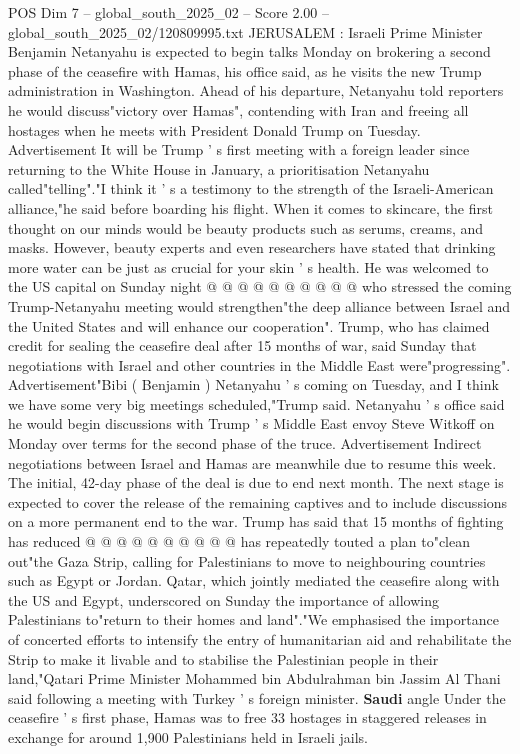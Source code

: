 \begin{textsample}{POS Dim 7 – global\_south\_2025\_02 – Score 2.00 – global\_south\_2025\_02/120809995.txt}  \label{ex:f7_pos_184}
JERUSALEM : Israeli Prime Minister Benjamin Netanyahu is expected to begin talks Monday on brokering a second phase of the ceasefire with Hamas, his office said, as he visits the new Trump administration in Washington.
Ahead of his departure, Netanyahu told reporters he would discuss"victory over Hamas", contending with Iran and freeing all hostages when he meets with President Donald Trump on Tuesday.
Advertisement It will be Trump ' s first meeting with a foreign leader since returning to the White House in January, a prioritisation Netanyahu called"telling"."I think it ' s a testimony to the strength of the Israeli-American alliance,"he said before boarding his flight.
When it comes to skincare, the first thought on our minds would be beauty products such as serums, creams, and masks.
However, beauty experts and even researchers have stated that drinking more water can be just as crucial for your skin ' s health.
He was welcomed to the US capital on Sunday night @ @ @ @ @ @ @ @ @ @ who stressed the coming Trump-Netanyahu meeting would strengthen"the deep alliance between Israel and the United States and will enhance our cooperation".
Trump, who has claimed credit for sealing the ceasefire deal after 15 months of war, said Sunday that negotiations with Israel and other countries in the Middle East were"progressing".
Advertisement"Bibi ( Benjamin ) Netanyahu ' s coming on Tuesday, and I think we have some very big meetings scheduled,"Trump said.
Netanyahu ' s office said he would begin discussions with Trump ' s Middle East envoy Steve Witkoff on Monday over terms for the second phase of the truce.
Advertisement Indirect negotiations between Israel and Hamas are meanwhile due to resume this week.
The initial, 42-day phase of the deal is due to end next month.
The next stage is expected to cover the release of the remaining captives and to include discussions on a more permanent end to the war.
Trump has said that 15 months of fighting has reduced @ @ @ @ @ @ @ @ @ @ has repeatedly touted a plan to"clean out"the Gaza Strip, calling for Palestinians to move to neighbouring countries such as Egypt or Jordan.
Qatar, which jointly mediated the ceasefire along with the US and Egypt, underscored on Sunday the importance of allowing Palestinians to"return to their homes and land"."We emphasised the importance of concerted efforts to intensify the entry of humanitarian aid and rehabilitate the Strip to make it livable and to stabilise the Palestinian people in their land,"Qatari Prime Minister Mohammed bin Abdulrahman bin Jassim Al Thani said following a meeting with Turkey ' s foreign minister. \textbf{Saudi} angle Under the ceasefire ' s first phase, Hamas was to free 33 hostages in staggered releases in exchange for around 1,900 Palestinians held in Israeli jails.

\end{textsample}
